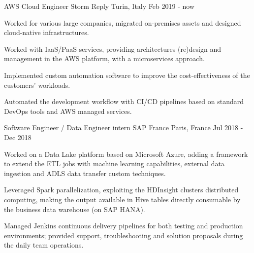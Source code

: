 

\begin{cventries}

  \cventry
    {AWS Cloud Engineer} %
    {Storm Reply} %
    {Turin, Italy} %
    {Feb 2019 - now} %
    {
        \begin{cvitems} %
            \item {Worked for various large companies, migrated on-premises assets and designed cloud-native infrastructures.}
            \item {Worked with IaaS/PaaS services, providing architectures (re)design and management in the AWS platform, with a microservices approach.}
            \item {Implemented custom automation software to improve the cost-effectiveness of the customers' workloads.}
            \item {Automated the development workflow with CI/CD pipelines based on standard DevOps tools and AWS managed services.}
        \end{cvitems}
    }

  \cventry
    {Software Engineer / Data Engineer intern} %
    {SAP France} %
    {Paris, France} %
    {Jul 2018 - Dec 2018} %
    {
      \begin{cvitems} %
        \item {Worked on a Data Lake platform based on Microsoft Azure, adding a framework to extend the ETL jobs with machine learning capabilities, external data ingestion and ADLS data transfer custom techniques.}
        \item {Leveraged Spark parallelization, exploiting the HDInsight clusters distributed computing, making the output available in Hive tables directly consumable by the business data warehouse (on SAP HANA).}
        \item {Managed Jenkins continuous delivery pipelines for both testing and production environments; provided support, troubleshooting and solution proposals during the daily team operations.}
      \end{cvitems}
    }
\end{cventries}

